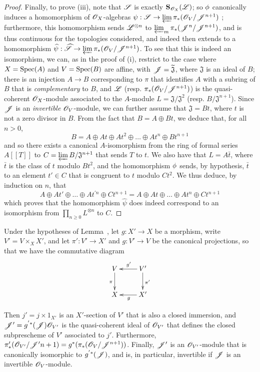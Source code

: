 \begin{proof}
Finally, to prove (iii), note that $\mathscr{S}$ is exactly $\mathbf{S}_{\mathscr{O}_X}(\mathscr{L})$;
so $\phi$ canonically induces a homomorphism of $\mathscr{O}_X$-algebras $\psi:\sh{S}\to\varprojlim\pi_*(\sh{O}_V/\sh{J}^{n+1})$ ;
furthermore, this homomorphism sends $\mathscr{L}^{\otimes n}$ to $\varprojlim_m\pi_*(\mathscr{J}^n/\mathscr{J}^{n+1})$, and is thus continuous for the topologies considered, and indeed then extends to a homomorphism $\widehat{\psi}:\widehat{\sh{S}}\to\varprojlim\pi_*(\sh{O}_V/\sh{J}^{n+1})$.
To see that this is indeed an isomorphism, we can, as in the proof of (i), restrict to the case where $X=\operatorname{Spec}(A)$ and $V=\operatorname{Spec}(B)$ are affine, with $\mathscr{J}=\widetilde{\mathfrak{J}}$, where $\mathfrak{J}$ is an ideal of $B$;
there is an injection $A\to B$ corresponding to $\pi$ that identifies $A$ with a subring of $B$ that is \emph{complementary} to $B$, and $\mathscr{L}$ (resp. $\pi_*(\mathscr{O}_V/\mathscr{J}^{n+1})$) is the quasi-coherent $\mathscr{O}_X$-module associated to the $A$-module $L=\mathfrak{J}/\mathfrak{J}^2$ (resp. $B/\mathfrak{J}^{n+1}$).
Since $\mathscr{J}$ is an \emph{invertible} $\mathscr{O}_V$-module, we can further assume that $\mathfrak{J}=Bt$, where $t$ is not a zero divisor in $B$.
From the fact that $B=A\oplus Bt$, we deduce that, for all $n>0$,
\[
  B = A \oplus At \oplus At^2 \oplus \ldots \oplus At^n \oplus Bt^{n+1}
\]
and so there exists a canonical $A$-isomorphism from the ring of formal series $A[[T]]$ to $C=\varprojlim B/\mathfrak{J}^{n+1}$ that sends $T$ to $t$.
We also have that $L=A\bar{t}$, where $\bar{t}$ is the class of $t$ modulo $Bt^2$, and the homomorphism $\phi$ sends, by hypothesis, $\bar{t}$ to an element $t'\in C$ that is congruent to $t$ modulo $Ct^2$.
We thus deduce, by induction on $n$, that
\[
  A \oplus At' \oplus \ldots \oplus At^{'n} \oplus Ct^{n+1}
  =
  A \oplus At \oplus \ldots \oplus At^n \oplus Ct^{n+1}
\]
which proves that the homomorphism $\widehat{\psi}$ does indeed correspond to an isomorphism from $\prod_{n\geq0}L^{\otimes n}$ to $C$.
\end{proof}

\begin{lemma}[8.10.2]
\label{II.8.10.2}
Under the hypotheses of Lemma~, let $g:X'\to X$ be a morphism,
write $V'=V\times_X X'$, and let $\pi':V'\to X'$ and $g:V'\to V$ be the canonical projections, so that we have the commutative diagram
\[
  \xymatrix{
    V
      \ar[d]_{\pi}
  & V'
      \ar[l]_{g'}
      \ar[d]^{\pi'}
  \\X
  & X'
      \ar[l]^{g}
  }
\]

Then $j'=j\times1_{X'}$ is an $X'$-section of $V'$ that is also a closed immersion, and $\mathscr{J}'=g^{'*}(\mathscr{J})\mathscr{O}_{V'}$ is the quasi-coherent ideal of $\mathscr{O}_{V'}$ that defines the closed subprescheme of $V'$ associated to $j'$.
Furthermore, $\pi'_*(\mathscr{O}_{V'}/\mathscr{J}{'n+1}) = g^*(\pi_*(\mathscr{O}_V/\mathscr{J}^{n+1}))$.
Finally, $\mathscr{J}'$ is an $\mathscr{O}_{V'}$-module that is canonically isomorphic to $g^{'*}(\mathscr{J})$, and is, in particular, invertible if $\mathscr{J}$ is an invertible $\mathscr{O}_V$-module.
\end{lemma}

